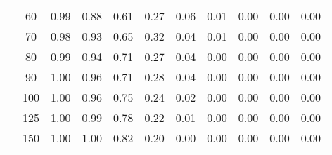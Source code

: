 \begin{table}[t]
\begin{center}
\begin{subtable}[c]{\textwidth}
\begin{center}
\begin{tabular}{rcccccccccc}
                                        & \multicolumn{1}{c|}{60}  & \num{0.99}  & \num{0.88}  & \num{0.61}  & \num{0.27}  & \num{0.06}  & \num{0.01}  & \num{0.00}  & \num{0.00}  & \num{0.00}  \\
                                        & \multicolumn{1}{c|}{70}  & \num{0.98}  & \num{0.93}  & \num{0.65}  & \num{0.32}  & \num{0.04}  & \num{0.01}  & \num{0.00}  & \num{0.00}  & \num{0.00}  \\
                                        & \multicolumn{1}{c|}{80}  & \num{0.99}  & \num{0.94}  & \num{0.71}  & \num{0.27}  & \num{0.04}  & \num{0.00}  & \num{0.00}  & \num{0.00}  & \num{0.00}  \\
                                        & \multicolumn{1}{c|}{90}  & \num{1.00}  & \num{0.96}  & \num{0.71}  & \num{0.28}  & \num{0.04}  & \num{0.00}  & \num{0.00}  & \num{0.00}  & \num{0.00}  \\
                                        & \multicolumn{1}{c|}{100}  & \num{1.00}  & \num{0.96}  & \num{0.75}  & \num{0.24}  & \num{0.02}  & \num{0.00}  & \num{0.00}  & \num{0.00}  & \num{0.00}  \\
                                        & \multicolumn{1}{c|}{125}  & \num{1.00}  & \num{0.99}  & \num{0.78}  & \num{0.22}  & \num{0.01}  & \num{0.00}  & \num{0.00}  & \num{0.00}  & \num{0.00}  \\
                                        & \multicolumn{1}{c|}{150}  & \num{1.00}  & \num{1.00}  & \num{0.82}  & \num{0.20}  & \num{0.00}  & \num{0.00}  & \num{0.00}  & \num{0.00}  & \num{0.00}  \\
                                    \end{tabular}
            \end{center}
        \end{subtable}

        \vspace{5mm}


\end{center}
\end{table}
